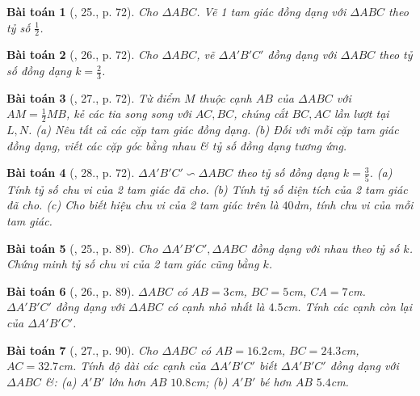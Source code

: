\documentclass{article}
\newtheorem{baitoan}{Bài toán}
\begin{document}
\begin{baitoan}[\cite{SGK_Toan_8_tap_2}, 25., p. 72]
	Cho $\Delta ABC$. Vẽ 1 tam giác đồng dạng với $\Delta ABC$ theo tỷ số $\frac{1}{2}$.
\end{baitoan}

\begin{baitoan}[\cite{SGK_Toan_8_tap_2}, 26., p. 72]
	Cho $\Delta ABC$, vẽ $\Delta A'B'C'$ đồng dạng với $\Delta ABC$ theo tỷ số đồng dạng $k = \frac{2}{3}$.
\end{baitoan}

\begin{baitoan}[\cite{SGK_Toan_8_tap_2}, 27., p. 72]
	Từ điểm $M$ thuộc cạnh $AB$ của $\Delta ABC$ với $AM = \frac{1}{2}MB$, kẻ các tia song song với $AC,BC$, chúng cắt $BC,AC$ lần lượt tại $L,N$. (a) Nêu tất cả các cặp tam giác đồng dạng. (b) Đối với mỗi cặp tam giác đồng dạng, viết các cặp góc bằng nhau \& tỷ số đồng dạng tương ứng.	
\end{baitoan}

\begin{baitoan}[\cite{SGK_Toan_8_tap_2}, 28., p. 72]
	$\Delta A'B'C'\backsim\Delta ABC$ theo tỷ số đồng dạng $k = \frac{3}{5}$. (a) Tính tỷ số chu vi của 2 tam giác đã cho. (b) Tính tỷ số diện tích của 2 tam giác đã cho. (c) Cho biết hiệu chu vi của 2 tam giác trên là $40$\emph{dm}, tính chu vi của mỗi tam giác.
\end{baitoan}

\begin{baitoan}[\cite{SBT_Toan_8_tap_2}, 25., p. 89]
	Cho $\Delta A'B'C',\Delta ABC$ đồng dạng với nhau theo tỷ số $k$. Chứng minh tỷ số chu vi của 2 tam giác cũng bằng $k$.
\end{baitoan}

\begin{baitoan}[\cite{SBT_Toan_8_tap_2}, 26., p. 89]
	$\Delta ABC$ có $AB = 3$\emph{cm}, $BC = 5$\emph{cm}, $CA = 7$\emph{cm}. $\Delta A'B'C'$ đồng dạng với $\Delta ABC$ có cạnh nhỏ nhất là $4.5$\emph{cm}. Tính các cạnh còn lại của $\Delta A'B'C'$.
\end{baitoan}

\begin{baitoan}[\cite{SBT_Toan_8_tap_2}, 27., p. 90]
	Cho $\Delta ABC$ có $AB = 16.2$\emph{cm}, $BC = 24.3$\emph{cm}, $AC = 32.7$\emph{cm}. Tính độ dài các cạnh của $\Delta A'B'C'$ biết $\Delta A'B'C'$ đồng dạng với $\Delta ABC$ \&: (a) $A'B'$ lớn hơn $AB$ $10.8$\emph{cm}; (b) $A'B'$ bé hơn $AB$ $5.4$\emph{cm}.
\end{baitoan}
\end{document}
